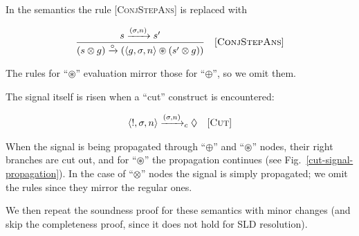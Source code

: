 In the semantics the rule \textsc{[ConjStepAns]} is replaced with

\[
\begin{array}{cr}
  \dfrac{s \xrightarrow{(\sigma, n)} s'}{(s \otimes g) \xrightarrow{\circ} (\left<{g, \sigma, n}\right> \circledast (s' \otimes g))} & \mbox{[\textsc{ConjStepAns}]} 
\end{array}
\]
\vskip3mm

The rules for ``$\circledast$'' evaluation mirror those for ``$\oplus$'', so we omit them.

The signal itself is risen when a ``cut'' construct is encountered:

\[
\begin{array}{cr}
  \left<{!, \sigma, n}\right> \xrightarrow{(\sigma, n)}_c \Diamond &\mbox{[\textsc{Cut}]} 
\end{array}
\]
\vskip3mm

When the signal is being propagated through ``$\oplus$'' and ``$\circledast$'' nodes, their right branches are cut out, and for ``$\circledast$'' the
propagation continues (see Fig.~\ref{cut-signal-propagation}). In the case of ``$\otimes$'' nodes the signal is simply propagated; we omit the rules since they mirror the regular ones.

We then repeat the soundness proof for these semantics with minor changes (and skip the completeness proof, since it does not hold for SLD resolution).
